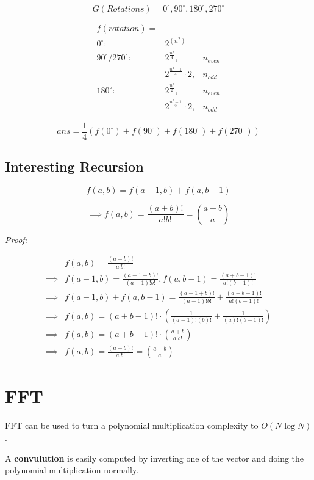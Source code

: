 	$$ G (Rotations) = 0^{\circ}, 90^{\circ}, 180^{\circ}, 270^{\circ} $$

	\begin{centering}
	\begin{align*}
	f(rotation) = & \\
	0^{\circ}: 				& 2^{(n^2)}  \\
	90^{\circ}/270^{\circ}:	& 2^{ \frac{n^2}{4} }, & n_{even} \\
							& 2^{ \frac{n^2-1}{4} } \cdot 2 , & n_{odd} \\
	180^{\circ}:			& 2^{ \frac{n^2}{2} }, & n_{even} \\
							& 2^{ \frac{n^2-1}{2} } \cdot 2 , & n_{odd}
	\end{align*}
	\end{centering}

	
	$$ans = \frac{1}{4} (f(0^{\circ}) + f(90^{\circ}) + f(180^{\circ}) + f(270^{\circ})) $$

	\subsection{Interesting Recursion}

	$$ f(a, b) = f(a-1, b) + f(a, b-1) $$

	$$ \implies f(a, b) = \frac{(a+b)!}{a! b!} = \binom{a+b}{a} $$

	\textit{Proof:}
	
	\begin{align*}
	&f(a, b) = \frac{(a+b)!}{a! b!}  \\ 
	\implies &f(a-1, b) = \frac{(a-1+b)!}{(a-1)! b!}, f(a, b-1) = \frac{(a+b-1)!}{a! (b-1)!}  \\
	\implies &f(a-1, b) + f(a, b-1) = \frac{(a-1+b)!}{(a-1)! b!} + \frac{(a+b-1)!}{a! (b-1)!}  \\
	\implies &f(a, b) = (a+b-1)! \cdot ( \frac{1}{(a-1)!(b)!} + \frac{1}{(a)!(b-1)!} )  \\
	\implies &f(a, b) = (a+b-1)! \cdot ( \frac{a+b}{a! b!} ) \\
	\implies &f(a, b) = \frac{(a+b)!}{a! b!} = \binom{a+b}{a} 
	\end{align*}

\section{FFT}

	FFT can be used to turn a polynomial multiplication complexity to $O(N \log{N})$.

	A \textbf{convulution} is easily computed by inverting one of the vector and doing the polynomial multiplication normally.

